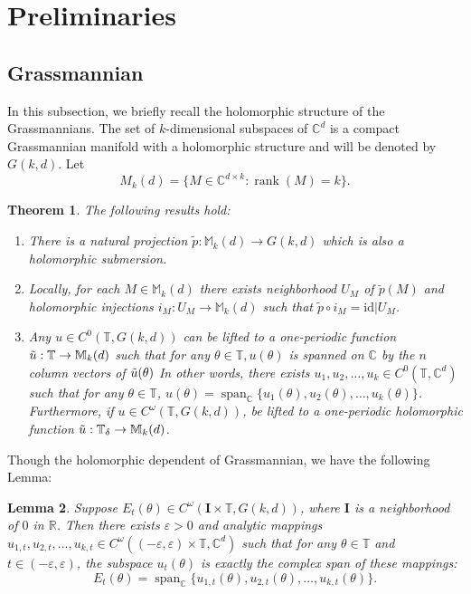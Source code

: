 \documentclass[11pt]{amsart}
\newtheorem{theorem}{Theorem}[section]
\newtheorem{lemma}[theorem]{Lemma}
\theoremstyle{remark}
\theoremstyle{definition}
\newcommand{\C}{{\mathbf C}}
\newcommand{\I}{{\mathbf I}}
\newcommand{\T}{{\mathbf T}}
\newcommand{\MM}{{\mathbb M}}
\def \C{{\mathcal{C}}}
\def \id{\mathrm{id}}
\def\C{{\mathbb C}}
\def\T{{\mathbb T}}
\begin{document}
\section{Preliminaries}\label{pre}


\subsection{Grassmannian }
In this subsection, we  briefly recall the holomorphic structure of the Grassmannians. The set of $k$-dimensional subspaces of $\C^d$ is a compact Grassmannian manifold with a holomorphic
structure and will be denoted by $G(k,d)$.
Let  $$M_k(d)=\{M\in \mathbb{C}^{d\times k}:\operatorname{rank}(M)=k\}.$$

\begin{theorem} \label{holomorphic}\cite{AJS}The following results hold:
\begin{enumerate}[{\rm (i)}]
\item There is a natural projection $\tilde p:\MM_k(d)\to G(k,d)$ which is also a holomorphic submersion.
\item Locally, for each  $M \in \MM_k(d)$ 
there exists neighborhood $U_M$ of $\tilde p(M)$ and
holomorphic injections $i_M: U_M\to \MM_k(d)$
such that $\tilde p \circ i_M=\id|U_M$.
\item Any $u \in C^0(\mathbb{T},G(k,d))$ can be lifted to a one-periodic function $\Tilde{u}: \T \rightarrow \MM_k(d)$ such that for any $ \theta \in \mathbb{T}, u(\theta)$ is spanned on $\mathbb{C}$ by the $n$ column vectors of $\Tilde{u}(\theta)$
         In other words, there exists $u_1,u_2,\dots,u_k \in C^0(\mathbb{T},\mathbb{C}^d) $ such that for any 
         $\theta \in \mathbb{T}$,
         $u(\theta)=\operatorname{span}_\mathbb{C}\{u_1(\theta),u_2(\theta),\dots,u_k(\theta)\}$.
         Furthermore, if $u \in C^\omega(\mathbb{T},G(k,d))$, be lifted to a one-periodic holomorphic function $\Tilde{u}: \T_\delta \rightarrow \MM_k(d)$.
\end{enumerate}
\end{theorem}
Though the holomorphic dependent of Grassmannian, we have the following Lemma:   

\begin{lemma}\label{parbasis}
    Suppose \( E_t(\theta) \in C^\omega(\I \times \mathbb{T}, G(k,d)) \), where \( \I \) is a neighborhood of \( 0 \) in \( \mathbb{R} \). Then there exists \( \varepsilon > 0 \) and analytic mappings \( u_{1,t}, u_{2,t}, \dots, u_{k,t} \in C^\omega((-\varepsilon,\varepsilon) \times \mathbb{T}, \mathbb{C}^d) \) such that for any \( \theta \in \mathbb{T} \) and \( t \in (-\varepsilon,\varepsilon) \), the subspace \( u_t(\theta) \) is exactly the complex span of these mappings:
    \[
    E_t(\theta) = \operatorname{span}_\mathbb{C}\{u_{1,t}(\theta), u_{2,t}(\theta), \dots, u_{k,t}(\theta)\}.
    \]
\end{lemma}
\end{document}
